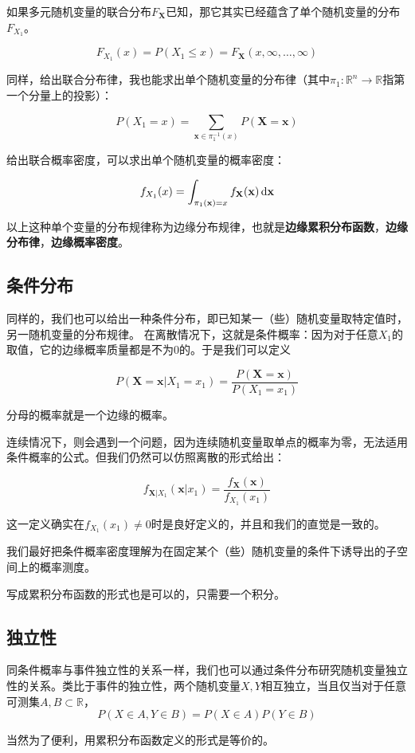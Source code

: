 如果多元随机变量的联合分布$F_{\mathbf{X}}$已知，那它其实已经蕴含了单个随机变量的分布$F_{X_1}$。

\[
F_{X_1}(x) = P(X_1\leq x) = F_{\mathbf{X}} (x,\infty,\ldots,\infty)
\]

同样，给出联合分布律，我也能求出单个随机变量的分布律（其中$\pi_1:\mathbb{R}^n\to\mathbb{R}$指第一个分量上的投影）：

\[
P(X_1=x) = \sum_{\mathbf{x}\in\pi_1^{-1}(x)}P(\mathbf{X}=\mathbf{x})
\]

给出联合概率密度，可以求出单个随机变量的概率密度：

\[
f_{X_1}(x)=\int_{\pi_1(\mathbf{x})=x}f_{\mathbf{X}}(\mathbf{x})\mathop{}\!\mathrm{d}\mathbf{x}
\]

以上这种单个变量的分布规律称为边缘分布规律，也就是\textbf{边缘累积分布函数}，\textbf{边缘分布律}，\textbf{边缘概率密度}。

\subsection{条件分布}
同样的，我们也可以给出一种条件分布，即已知某一（些）随机变量取特定值时，另一随机变量的分布规律。
在离散情况下，这就是条件概率：因为对于任意$X_1$的取值，它的边缘概率质量都是不为$0$的。于是我们可以定义

\[
P(\mathbf{X}=\mathbf{x}|X_1=x_1)=\frac{P(\mathbf{X}=\mathbf{x})}{P(X_1=x_1)}
\]

分母的概率就是一个边缘的概率。

连续情况下，则会遇到一个问题，因为连续随机变量取单点的概率为零，无法适用条件概率的公式。但我们仍然可以仿照离散的形式给出：

\[
f_{\mathbf{X}|X_1}(\mathbf{x}|x_1)=\frac{f_\mathbf{X}(\mathbf{x})}{f_{X_1}(x_1)}
\]

这一定义确实在$f_{X_1}(x_1)\neq 0$时是良好定义的，并且和我们的直觉是一致的。

我们最好把条件概率密度理解为在固定某个（些）随机变量的条件下诱导出的子空间上的概率测度。

写成累积分布函数的形式也是可以的，只需要一个积分。

\subsection{独立性}
同条件概率与事件独立性的关系一样，我们也可以通过条件分布研究随机变量独立性的关系。类比于事件的独立性，两个随机变量$X,Y$相互独立，当且仅当对于任意可测集$A,B\subset \mathbb{R}$，
\[
P(X\in A,Y\in B) = P(X\in A)P(Y\in B)
\]

当然为了便利，用累积分布函数定义的形式是等价的。

